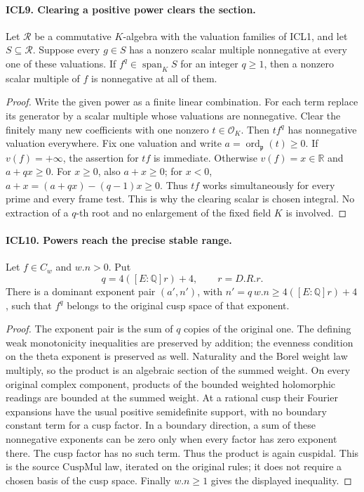 \paragraph{ICL9. Clearing a positive power clears the section.}
\label{claim:ICL9}
Let \(\mathcal R\) be a commutative \(K\)-algebra with the
valuation families of ICL1, and let \(S\subseteq\mathcal R\).
Suppose every \(g\in S\) has a nonzero scalar multiple
nonnegative at every one of these valuations.  If
\(f^q\in\operatorname{span}_K S\) for an integer \(q\geq1\),
then a nonzero scalar multiple of \(f\) is nonnegative at
all of them.
\begin{proof}
Write the given power as a finite linear combination.  For
each term replace its generator by a scalar multiple whose
valuations are nonnegative.  Clear the finitely many new
coefficients with one nonzero \(t\in\mathcal O_K\).
Then \(t f^q\) has nonnegative valuation everywhere.  Fix
one valuation and write \(a=\operatorname{ord}_{\mathfrak p}(t)\geq0\).
If \(v(f)=+\infty\), the assertion for \(tf\) is immediate.
Otherwise \(v(f)=x\in\mathbb R\) and \(a+qx\geq0\).
For \(x\geq0\), also \(a+x\geq0\); for \(x<0\),
\(a+x=(a+qx)-(q-1)x\geq0\).  Thus \(tf\) works
simultaneously for every prime and every frame test.
This is why the clearing scalar is chosen integral.
No extraction of a \(q\)-th root and no enlargement of
the fixed field \(K\) is involved.
\end{proof}

\paragraph{ICL10. Powers reach the precise stable range.}
\label{claim:ICL10}
Let \(f\in C_w\) and \(w.n>0\).  Put
\[
 q=4([E:\mathbb Q]r)+4,\qquad r=D.R.r.
\]
There is a dominant exponent pair \((a',n')\), with
\(n'=q\,w.n\geq4([E:\mathbb Q]r)+4\), such that
\(f^q\) belongs to the original cusp space of that exponent.
\begin{proof}
The exponent pair is the sum of \(q\) copies of the original
one.  The defining weak monotonicity inequalities are
preserved by addition; the evenness condition on the theta
exponent is preserved as well.  Naturality and the Borel
weight law multiply, so the product is an algebraic section
of the summed weight.  On every original complex component,
products of the bounded weighted holomorphic readings are
bounded at the summed weight.  At a rational cusp their
Fourier expansions have the usual positive semidefinite
support, with no boundary constant term for a cusp factor.
In a boundary direction, a sum of these nonnegative
exponents can be zero only when every factor has zero
exponent there.  The cusp factor has no such term.  Thus the
product is again cuspidal.  This is the source
\(\mathrm{CuspMul}\) law, iterated on the original rules;
it does not require a chosen basis of the cusp space.
Finally \(w.n\geq1\) gives the displayed inequality.
\end{proof}

